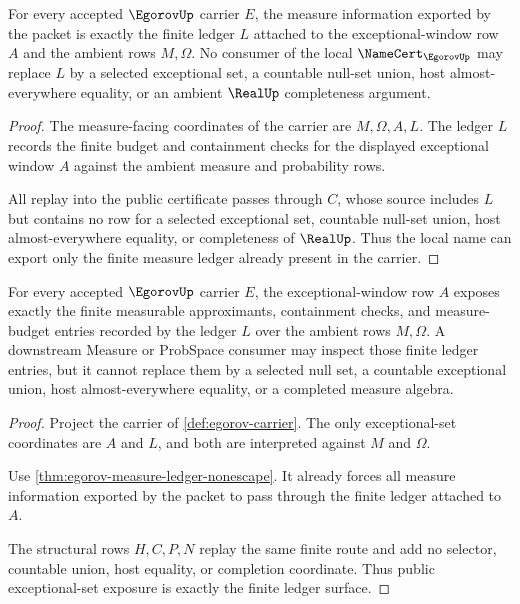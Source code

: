 \begin{theorem}\label{thm:egorov-measure-ledger-nonescape}
For every accepted $\EgorovUp$ carrier $E$, the measure information exported by the packet is exactly the finite ledger $L$ attached to the exceptional-window row $A$ and the ambient rows $M,\Omega$. No consumer of the local $\NameCert_{\EgorovUp}$ may replace $L$ by a selected exceptional set, a countable null-set union, host almost-everywhere equality, or an ambient $\RealUp$ completeness argument.
\end{theorem}
\begin{proof}
The measure-facing coordinates of the carrier are $M,\Omega,A,L$. The ledger $L$ records the finite budget and containment checks for the displayed exceptional window $A$ against the ambient measure and probability rows.

All replay into the public certificate passes through $C$, whose source includes $L$ but contains no row for a selected exceptional set, countable null-set union, host almost-everywhere equality, or completeness of $\RealUp$. Thus the local name can export only the finite measure ledger already present in the carrier.
\end{proof}

\begin{theorem}\label{thm:egorov-exceptional-set-ledger-exposure}
For every accepted $\EgorovUp$ carrier $E$, the exceptional-window row $A$ exposes exactly the finite measurable approximants, containment checks, and measure-budget entries recorded by the ledger $L$ over the ambient rows $M,\Omega$. A downstream Measure or ProbSpace consumer may inspect those finite ledger entries, but it cannot replace them by a selected null set, a countable exceptional union, host almost-everywhere equality, or a completed measure algebra.
\end{theorem}
\begin{proof}
Project the carrier of \autoref{def:egorov-carrier}. The only exceptional-set coordinates are $A$ and $L$, and both are interpreted against $M$ and $\Omega$.

Use \autoref{thm:egorov-measure-ledger-nonescape}. It already forces all measure information exported by the packet to pass through the finite ledger attached to $A$.

The structural rows $H,C,P,N$ replay the same finite route and add no selector, countable union, host equality, or completion coordinate. Thus public exceptional-set exposure is exactly the finite ledger surface.
\end{proof}

